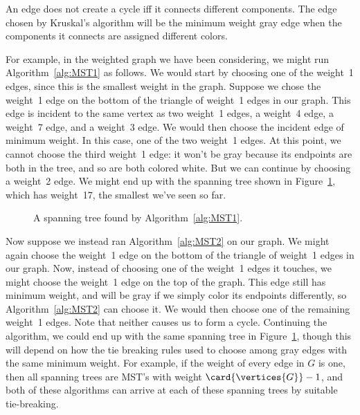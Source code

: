 An edge does not create a cycle iff it connects different components.
The edge chosen by Kruskal's algorithm will be the minimum weight gray
edge when the components it connects are assigned different colors.

\iffalse  %
The edges between different components are exactly the edges that are
gray under some solid coloring, namely any coloring where the
components it connects have different colors.
\fi

For example, in the weighted graph we have been considering, we might
run Algorithm~\ref{alg:MST1} as follows.  We would start by choosing
one of the weight~1 edges, since this is the smallest weight in the
graph.  Suppose we chose the weight~1 edge on the bottom of the
triangle of weight~1 edges in our graph.  This edge is incident to the
same vertex as two weight~1 edges, a weight~4 edge, a weight~7 edge,
and a weight~3 edge.  We would then choose the incident edge of
minimum weight.  In this case, one of the two weight~1 edges.  At this
point, we cannot choose the third weight~1 edge: it won't be gray
because its endpoints are both in the tree, and so are both colored
white.  But we can continue by choosing a weight~2 edge.  We might end
up with the spanning tree shown in Figure~\ref{fig:5KC}, which has
weight~17, the smallest we've seen so far.

\begin{figure}


\caption{A spanning tree found by Algorithm~\ref{alg:MST1}.}

\label{fig:5KC}

\end{figure}

Now suppose we instead ran Algorithm~\ref{alg:MST2} on our graph.  We
might again choose the weight~1 edge on the bottom of the triangle of
weight~1 edges in our graph.  Now, instead of choosing one of the
weight~1 edges it touches, we might choose the weight~1 edge on the
top of the graph.  This edge still has minimum weight, and will be
gray if we simply color its endpoints differently, so
Algorithm~\ref{alg:MST2} can choose it.  We would then choose one of
the remaining weight~1 edges.  Note that neither causes us to form a
cycle.  Continuing the algorithm, we could end up with the same
spanning tree in Figure~\ref{fig:5KC}, though this will depend on how
the tie breaking rules used to choose among gray edges with the same
minimum weight.  For example, if the weight of every edge in $G$ is
one, then all spanning trees are MST's with weight
$\card{\vertices{G}}-1$, and both of these algorithms can arrive at
each of these spanning trees by suitable tie-breaking.

